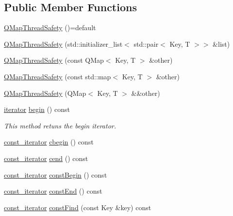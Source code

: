 \subsection*{Public Member Functions}
\begin{DoxyCompactItemize}
\item 
\hyperlink{class_q_map_thread_safety_a8fb3ac28b9f65184a844cf76938df0f6}{Q\+Map\+Thread\+Safety} ()=default
\item 
\hyperlink{class_q_map_thread_safety_a8b1bc71d8c92c4d01b6b3baae9787bb4}{Q\+Map\+Thread\+Safety} (std\+::initializer\+\_\+list$<$ std\+::pair$<$ Key, T $>$$>$ \&list)
\item 
\hyperlink{class_q_map_thread_safety_a368c8f4f05a48864209ab6ff5cf2f090}{Q\+Map\+Thread\+Safety} (const Q\+Map$<$ Key, T $>$ \&other)
\item 
\hyperlink{class_q_map_thread_safety_a1335c04a2df7eda320f7a778854531fc}{Q\+Map\+Thread\+Safety} (const std\+::map$<$ Key, T $>$ \&other)
\item 
\hyperlink{class_q_map_thread_safety_a9aacfb2a81fb927546a222cbfd78000d}{Q\+Map\+Thread\+Safety} (Q\+Map$<$ Key, T $>$ \&\&other)
\item 
\hyperlink{class_q_map_thread_safety_a454c8af3f68e6d61aecaf1b918aa525b}{iterator} \hyperlink{class_q_map_thread_safety_ac197a5375913e4ac19910b9bc4191a95}{begin} () const
\begin{DoxyCompactList}\small\item\em This method retuns the begin iterator. \end{DoxyCompactList}\item 
\hyperlink{class_q_map_thread_safety_aa58d8479729f72b33e305a4d0ca957bd}{const\+\_\+iterator} \hyperlink{class_q_map_thread_safety_aeddc5f7a55aebb3e93d78cf30a3dd2e1}{cbegin} () const
\item 
\hyperlink{class_q_map_thread_safety_aa58d8479729f72b33e305a4d0ca957bd}{const\+\_\+iterator} \hyperlink{class_q_map_thread_safety_a199144509173057ede04d61f7294b266}{cend} () const
\item 
\hyperlink{class_q_map_thread_safety_aa58d8479729f72b33e305a4d0ca957bd}{const\+\_\+iterator} \hyperlink{class_q_map_thread_safety_a300f55a4c8e8ed3b5ccc2824dc18e60c}{const\+Begin} () const
\item 
\hyperlink{class_q_map_thread_safety_aa58d8479729f72b33e305a4d0ca957bd}{const\+\_\+iterator} \hyperlink{class_q_map_thread_safety_aa98a2af8cafc423c6bc6a04fec106b39}{const\+End} () const
\item 
\hyperlink{class_q_map_thread_safety_aa58d8479729f72b33e305a4d0ca957bd}{const\+\_\+iterator} \hyperlink{class_q_map_thread_safety_ac364cabf8837a0b174016656b6bda81b}{const\+Find} (const Key \&key) const
$$
\end{DoxyCompactItemize}
